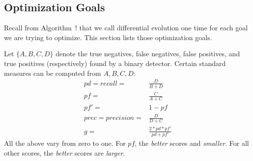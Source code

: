 \documentclass{sig-alternative}
\begin{document}
\subsection{Optimization Goals}

Recall from Algorithm~! that we call differential evolution one time for each
goal we are trying to optimize. This section lists those optimization goals.

Let $\{A,B,C,D\}$ denote the
true negatives, 
false negatives, 
false positives, and 
true positives
(respectively) found by a binary detector. 
Certain standard measures can be computed from
$A,B,C,D$: 
\[
\begin{array}{ll}
pd=recall=&\frac{D}{B+D}\\
pf=&\frac{C}{A+C}\\
pf'=& 1 - pf\\
prec=precision=&\frac{D}{D+C}\\ 
 g = & \frac{2*pd*pf'}{pd + pf'}
\end{array}
\]
All the above vary from zero to one. For $pf$, the {\em better} scores and {\em smaller}.
For all other scores, the {\em better} scores are {\em larger}.
\end{document}
